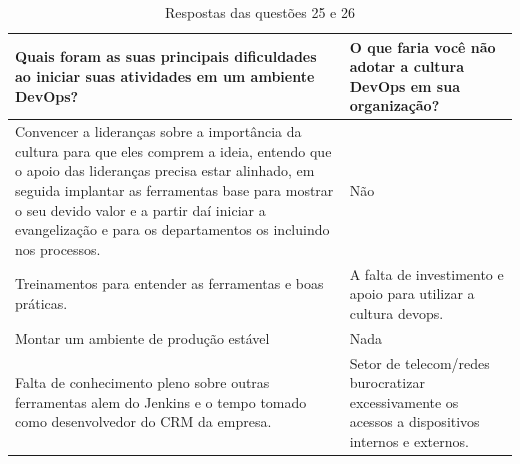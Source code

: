 \documentclass[twoside,english,brazilian]{UNISINOSartigo}
\begin{document}
\begin{table}[h]
\footnotesize
    \caption{Respostas das questões 25 e 26}
   \begin{tabularx}{\columnwidth}{XX}
    \hline
    \textbf{Quais foram as suas principais dificuldades ao iniciar suas atividades em um ambiente DevOps?}                                                                                                                                                                                                                                  & \textbf{O que faria você não adotar a cultura DevOps em sua organização?}                                                                                            \\ \hline
       Convencer   a lideranças sobre a importância da cultura para que eles comprem a ideia,   entendo que o apoio das lideranças precisa estar alinhado, em seguida   implantar as ferramentas base para mostrar o seu devido valor e a partir daí   iniciar a evangelização e para os departamentos os incluindo nos processos. &    Não                                                                                                                                                      \\ \hline
       Treinamentos   para entender as ferramentas e boas práticas.                                                                                                                                                                                                                                                                &    A falta   de investimento e apoio para utilizar a cultura devops.                                                                                        \\ \hline
    Montar um ambiente de produção estável                                                                                                                                                                                                                                                                                         &    Nada                                                                                                                                                     \\ \hline
       Falta de   conhecimento pleno sobre outras ferramentas alem do Jenkins e o tempo tomado   como desenvolvedor do CRM da empresa.                                                                                                                                                                                             &    Setor de   telecom/redes burocratizar excessivamente os acessos a dispositivos internos   e externos.                                                    \\ \hline

\end{tabularx}
\end{table}
\end{document}
